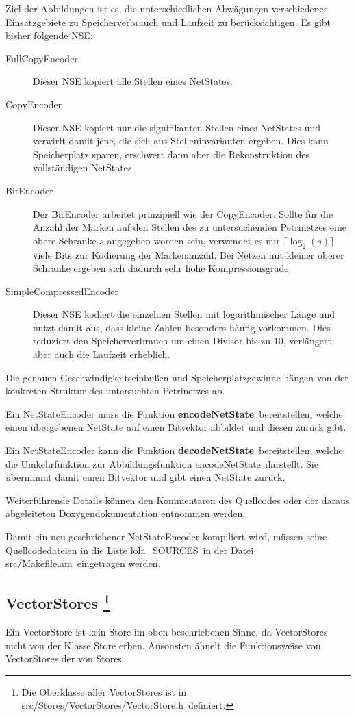 \documentclass[12pt,a4paper,titlepage]{scrartcl}
\renewcommand \( {\left (}
\renewcommand \) {\right )}
\renewcommand \[ {\left [}
\renewcommand \] {\right ]}
\newcommand \Flqq {\flqq\ }
\begin{document}
Ziel der Abbildungen ist es, die unterschiedlichen Abwägungen verschiedener Einsatzgebiete zu Speicherverbrauch und Laufzeit zu berücksichtigen. Es gibt bisher folgende NSE:
\begin{description}
\item[FullCopyEncoder] Dieser NSE kopiert alle Stellen eines NetStates.
\item[CopyEncoder] Dieser NSE kopiert nur die signifikanten Stellen eines NetStates und verwirft damit jene, die sich aus Stelleninvarianten ergeben. Dies kann Speicherplatz sparen, erschwert dann aber die Rekonstruktion des vollständigen NetStates.
\item[BitEncoder] Der BitEncoder arbeitet prinzipiell wie der CopyEncoder. Sollte für die Anzahl der Marken auf den Stellen des zu untersuchenden Petrinetzes eine obere Schranke $s$ angegeben worden sein, verwendet es nur $\lceil \log_2(s)\rceil$ viele Bits zur Kodierung der Markenanzahl. Bei Netzen mit kleiner oberer Schranke ergeben sich dadurch sehr hohe Kompressionsgrade.
\item[SimpleCompressedEncoder] Dieser NSE kodiert die einzelnen Stellen mit logarithmischer Länge und nutzt damit aus, dass kleine Zahlen besonders häufig vorkommen. Dies reduziert den Speicherverbrauch um einen Divisor bis zu $10$, verlängert aber auch die Laufzeit erheblich.
\end{description}
Die genauen Geschwindigkeitseinbußen und Speicherplatzgewinne hängen von der konkreten Struktur des untersuchten Petrinetzes ab.

Ein NetStateEncoder muss die Funktion \frqq\textbf{encodeNetState}\Flqq bereitstellen, welche einen übergebenen NetState auf einen Bitvektor abbildet und diesen zurück gibt.

Ein NetStateEncoder kann die Funktion \frqq\textbf{decodeNetState}\Flqq bereitstellen, welche die Umkehrfunktion zur Abbildungsfunktion \frqq encodeNetState\Flqq darstellt. Sie übernimmt damit einen Bitvektor und gibt einen NetState zurück.

Weiterführende Details können den Kommentaren des Quellcodes oder der daraus abgeleiteten Doxygendokumentation entnommen werden.

Damit ein neu geschriebener NetStateEncoder kompiliert wird, müssen seine Quellcodedateien in die Liste \frqq lola\_SOURCES\Flqq in der Datei \frqq src/Makefile.am\Flqq eingetragen werden.

\subsection{VectorStores
\protect\footnote{Die Oberklasse aller VectorStores ist in \frqq src/Stores/VectorStores/VectorStore.h\Flqq definiert.}}
\label{kap:VectorStores}
Ein VectorStore ist kein Store im oben beschriebenen Sinne, da VectorStores nicht von der Klasse Store erben. Ansonsten ähnelt die Funktionsweise von VectorStores der von Stores.
\end{document}
